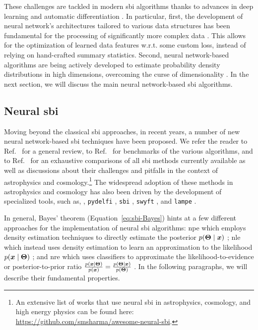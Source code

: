 These challenges are tackled in modern \gls*{sbi} algorithms thanks to advances in deep learning \cite{lecun2015deep} and automatic differentiation \cite{baydin2018automatic}. In particular, first, the development of neural network's architectures tailored to various data structures has been fundamental for the processing of significantly more complex data  \cite{lecun2015deep}. This allows for the optimization of learned data features w.r.t. some custom loss, instead of relying on hand-crafted summary statistics. Second, neural network-based algorithms are being actively developed to estimate probability density distributions in high dimensions, overcoming the curse of dimensionality \cite[\eg][]{papamakarios2019neural, papamakarios2021normalizing, Papamakarios:2016ctj}. In the next section, we will discuss the main neural network-based \gls*{sbi} algorithms. 


\subsection{Neural \gls*{sbi}} \label{subsec:nsbi}

Moving beyond the classical \gls*{sbi} approaches, in recent years, a number of new neural network-based \gls*{sbi} techniques have been proposed. We refer the reader to Ref.~\cite{Cranmer:2019eaq} for a general review, to Ref.~\cite{Lueckmann:2021aa} for benchmarks of the various algorithms, and to Ref.~\cite{Ho:2024whi} for an exhaustive comparisons of all \gls*{sbi} methods currently available as well as discussions about their challenges and pitfalls in the context of astrophysics and cosmology.\footnote{An extensive list of works that use neural \gls*{sbi} in astrophysics, cosmology, and high energy physics can be found here: \url{https://github.com/smsharma/awesome-neural-sbi}.}
The widespread adoption of these methods in astrophysics and cosmology has also been driven by the development of specialized tools, such as, \eg, \texttt{pydelfi} \cite{Alsing:2019xrx}, \texttt{sbi} \cite{tejero-cantero2020sbi}, \texttt{swyft} \cite{Miller2022}, and \texttt{lampe} \cite{lampe}. 

In general, Bayes' theorem (Equation~\eqref{eq:sbi-Bayes}) hints at a few different approaches for the implementation of neural \gls*{sbi} algorithms: \gls*{npe} which employs density estimation techniques to directly estimate the posterior $p(\bm{\Theta}\mid\bm{x})$ \cite{Papamakarios:2016ctj, Greenberg:2019aa}; \gls*{nle} which instead uses density estimation to learn an approximation to the likelihood $p(\bm{x}\mid\bm{\Theta})$ \cite{Papamakarios:2018aa, Durkan:2018aa}; and \gls*{nre} which uses classifiers to approximate the likelihood-to-evidence or posterior-to-prior ratio $\frac{p(\bm{x}\mid\bm{\Theta})}{p(\bm{x})}=\frac{p(\bm{\Theta}\mid\bm{x})}{p(\bm{\Theta})}$ \cite{cranmer2015approximating, gutmann2018likelihood, Hermans:2019ioj, thomas2022likelihood, Miller:2020hua}. In the following paragraphs, we will describe their fundamental properties.


